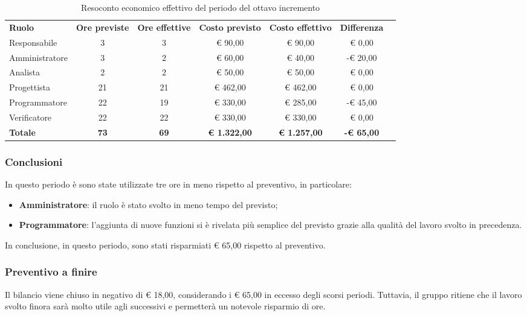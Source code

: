 \documentclass[../piano-di-progetto.tex]{subfiles}
\begin{document}
  \begin{table}[H]
    \centering
    \begin{tabular}{lcccccc}
      \rowcolor{lightgray}
      \textbf{Ruolo}  & \textbf{Ore previste} & \textbf{Ore effettive} & \textbf{Costo previsto} & \textbf{Costo effettivo} & \textbf{Differenza} \\
Responsabile    & 3           & 3           & € 90,00             & € 90,00             & € 0,00            \\
Amministratore  & 3           & 2           & € 60,00             & € 40,00             & -€ 20,00          \\
Analista        & 2           & 2           & € 50,00             & € 50,00             & € 0,00            \\
Progettista     & 21          & 21          & € 462,00            & € 462,00            & € 0,00            \\
Programmatore   & 22          & 19          & € 330,00            & € 285,00            & -€ 45,00          \\
Verificatore    & 22          & 22          & € 330,00            & € 330,00            & € 0,00            \\
\textbf{Totale} & \textbf{73} & \textbf{69} & \textbf{€ 1.322,00} & \textbf{€ 1.257,00} & \textbf{-€ 65,00}

    \end{tabular}
    \caption{Resoconto economico effettivo del periodo del ottavo incremento}
  \end{table}
\subsubsection{Conclusioni}
In questo periodo è sono state utilizzate tre ore in meno rispetto al preventivo, in particolare:


\begin{itemize}
    \item \textbf{Amministratore}: il ruolo è stato svolto in meno tempo del previsto;
    \item \textbf{Programmatore}: l'aggiunta di nuove funzioni si è rivelata più semplice del previsto grazie alla qualità del lavoro svolto in precedenza.
\end{itemize}
In conclusione, in questo periodo, sono stati risparmiati € 65,00 rispetto al preventivo.

\subsubsection{Preventivo a finire}
Il bilancio viene chiuso in negativo di € 18,00, considerando i € 65,00 in eccesso degli scorsi periodi. Tuttavia, il gruppo ritiene che il lavoro svolto finora sarà molto utile agli successivi e permetterà un notevole risparmio di ore.
\end{document}
